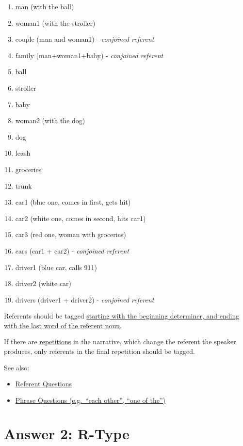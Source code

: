 \documentclass[
]{book}
\providecommand{\tightlist}{%
  \setlength{\itemsep}{0pt}\setlength{\parskip}{0pt}}
\begin{document}
\begin{enumerate}
\def\labelenumi{\arabic{enumi}.}
\tightlist
\item
  man (with the ball)
\item
  woman1 (with the stroller)
\item
  couple (man and woman1) - \emph{conjoined referent}
\item
  family (man+woman1+baby) - \emph{conjoined referent}
\item
  ball
\item
  stroller
\item
  baby
\item
  woman2 (with the dog)
\item
  dog
\item
  leash
\item
  groceries
\item
  trunk
\item
  car1 (blue one, comes in first, gets hit)
\item
  car2 (white one, comes in second, hits car1)
\item
  car3 (red one, woman with groceries)
\item
  cars (car1 + car2) - \emph{conjoined referent}
\item
  driver1 (blue car, calls 911)
\item
  driver2 (white car)
\item
  drivers (driver1 + driver2) - \emph{conjoined referent}
\end{enumerate}

Referents should be tagged
\protect\hyperlink{span-of-referent-annotations}{starting with the beginning determiner, and ending with the last word of the referent noun}.

If there are \protect\hyperlink{identifying-repitions}{repetitions} in the narrative,
which change the referent the speaker produces,
only referents in the final repetition should be tagged.

See also:

\begin{itemize}
\tightlist
\item
  \protect\hyperlink{referents-1}{Referent Questions}
\item
  \protect\hyperlink{phrases}{Phrase Questions (e.g.~``each other'', ``one of the'')}
\end{itemize}

\hypertarget{answer-2-r-type}{%
\chapter{Answer 2: R-Type}\label{answer-2-r-type}}
\end{document}
